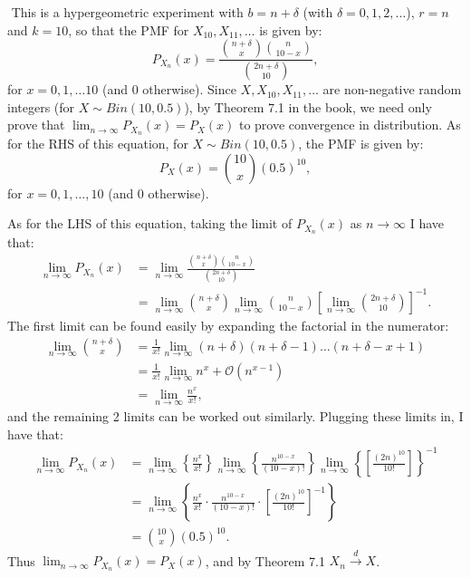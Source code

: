\begin{problem}{11} $ $
This is a hypergeometric experiment with $b = n+\delta$ (with $\delta = 0, 1, 2, \ldots$), $r=n$ and $k=10$, so that the PMF for $X_{10}, X_{11}, \ldots$ is given by:
\begin{equation*}
P_{X_n}(x) = \frac{\binom{n+\delta}{x}\binom{n}{10-x}}{\binom{2n+\delta}{10}},
\end{equation*}
for $x = 0, 1, \ldots 10$ (and 0 otherwise).  Since $X, X_{10}, X_{11}, \ldots$ are non-negative random integers (for $X\sim Bin(10, 0.5)$), by Theorem 7.1 in the book, we need only prove that $\lim_{n \rightarrow \infty}P_{X_n}(x) = P_X(x)$ to prove convergence in distribution.  As for the RHS of this equation, for $X\sim Bin(10, 0.5)$, the PMF is given by:
\begin{equation*}
P_{X}(x) = \binom{10}{x}(0.5)^{10},
\end{equation*}
for $x=0, 1, \ldots, 10$ (and 0 otherwise).   

As for the LHS of this equation, taking the limit of $P_{X_n}(x)$ as $n \rightarrow \infty$ I have that:
\begin{align*}
\lim_{n \rightarrow \infty}P_{X_n}(x) &= \lim_{n \rightarrow \infty} \frac{\binom{n+\delta}{x}\binom{n}{10-x}}{\binom{2n+\delta}{10}} \\
& = \lim_{n \rightarrow \infty} \binom{n+\delta}{x} \lim_{n \rightarrow \infty} \binom{n}{10-x}  \left[\lim_{n \rightarrow \infty} \binom{2n+\delta}{10}\right]^{-1}.
\end{align*}
The first limit can be found easily by expanding the factorial in the numerator:
\begin{align*}
\lim_{n \rightarrow \infty} \binom{n+\delta}{x} &= \frac{1}{x!}\lim_{n \rightarrow \infty} (n+\delta)(n+\delta-1)\ldots(n+\delta-x+1) \\
&=\frac{1}{x!}\lim_{n \rightarrow \infty} n^x + \mathcal{O}\left( n^{x-1}\right) \\
& = \lim_{n \rightarrow \infty} \frac{n^x}{x!},
\end{align*}
and the remaining 2 limits can be worked out similarly.  Plugging these limits in, I have that:
\begin{align*}
\lim_{n \rightarrow \infty}P_{X_n}(x) &= \lim_{n \rightarrow \infty} \left \{ \frac{n^x}{x!} \right \} \lim_{n \rightarrow \infty} \left \{ \frac{n^{10-x}}{(10-x)!} \right \} \lim_{n \rightarrow \infty}  \left \{ \left[\frac{(2n)^{10}}{10!} \right] \right \}^{-1}\\
&= \lim_{n \rightarrow \infty}\left \{ \frac{n^x}{x!} \cdot \frac{n^{10-x}}{(10-x)!} \cdot \left[\frac{(2n)^{10}}{10!} \right]^{-1} \right \} \\
& = \binom{10}{x}(0.5)^{10}.
\end{align*}
Thus $\lim_{n \rightarrow \infty}P_{X_n}(x) = P_X(x)$, and by Theorem 7.1 $X_{n} \xrightarrow{d} X$.

\end{problem}

